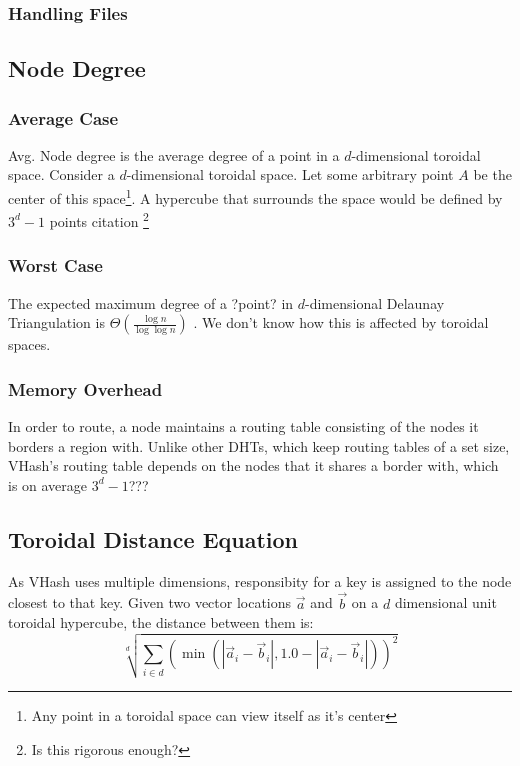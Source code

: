 \documentclass{IEEEtran}
\begin{document}
\subsubsection{Handling Files}



\subsection{Node Degree}

\subsubsection{Average Case}
Avg. Node degree is the average degree of a point in a $d$-dimensional toroidal space.  
Consider a $d$-dimensional toroidal space.  Let some arbitrary point $A$ be the center of this space\footnote{Any point in a toroidal space can view itself as it's center}.  A hypercube that surrounds the space would be defined by $3^d -1$ points citation \footnote{Is this rigorous enough?}

\subsubsection{Worst Case}


The expected maximum degree of a ?point?  in $d$-dimensional Delaunay Triangulation is $\Theta(\frac{\log n}{\log \log n} )$ \cite{bern1991expected}.  We don't know how this is affected by toroidal spaces.



\subsubsection{Memory Overhead}
In order to route, a node maintains a routing table consisting of the nodes it borders a region with.  Unlike other DHTs, which keep routing tables of a set size, VHash's routing table depends on the nodes that it shares a border with, which is on average $3^d -1$???


 
\subsection{Toroidal Distance Equation}
As VHash uses multiple dimensions, responsibity for a key is assigned to the node closest to that key. Given two vector locations $\vec{a}$ and $\vec{b}$ on a  $d$ dimensional unit toroidal hypercube, the distance between them is:
\[  \sqrt[d]{\sum\limits_{i\in d} (\min(|\vec{a}_i-\vec{b}_i|, 1.0-|\vec{a}_i-\vec{b}_i|))^2}\]
\end{document}
